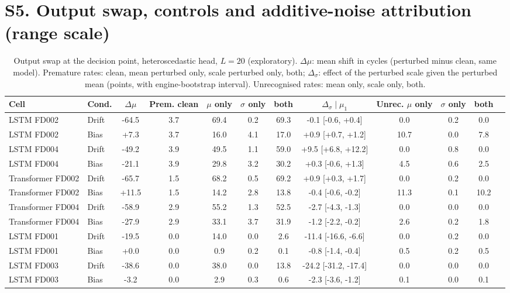 \documentclass[10pt,a4paper]{article}
\begin{document}
\FloatBarrier
\section*{S5. Output swap, controls and additive-noise attribution (range scale)}
\begin{landscape}
\begin{table}[H]\centering\scriptsize
\caption{Output swap at the decision point, heteroscedastic head, $L=20$ (exploratory). $\Delta\mu$: mean shift in cycles (perturbed minus clean, same model). Premature rates: clean, mean perturbed only, scale perturbed only, both; $\Delta_\sigma$: effect of the perturbed scale given the perturbed mean (points, with engine-bootstrap interval). Unrecognised rates: mean only, scale only, both.}
\begin{tabular}{llcccccccccc}\toprule
Cell & Cond. & $\Delta\mu$ & Prem. clean & $\mu$ only & $\sigma$ only & both & $\Delta_\sigma\mid\mu_1$ & Unrec. $\mu$ only & $\sigma$ only & both \\ \midrule
LSTM FD002 & Drift & -64.5 & 3.7 & 69.4 & 0.2 & 69.3 & -0.1 [-0.6, +0.4] & 0.0 & 0.2 & 0.0 \\
LSTM FD002 & Bias & +7.3 & 3.7 & 16.0 & 4.1 & 17.0 & +0.9 [+0.7, +1.2] & 10.7 & 0.0 & 7.8 \\
LSTM FD004 & Drift & -49.2 & 3.9 & 49.5 & 1.1 & 59.0 & +9.5 [+6.8, +12.2] & 0.0 & 0.8 & 0.0 \\
LSTM FD004 & Bias & -21.1 & 3.9 & 29.8 & 3.2 & 30.2 & +0.3 [-0.6, +1.3] & 4.5 & 0.6 & 2.5 \\
Transformer FD002 & Drift & -65.7 & 1.5 & 68.2 & 0.5 & 69.2 & +0.9 [+0.3, +1.7] & 0.0 & 0.2 & 0.0 \\
Transformer FD002 & Bias & +11.5 & 1.5 & 14.2 & 2.8 & 13.8 & -0.4 [-0.6, -0.2] & 11.3 & 0.1 & 10.2 \\
Transformer FD004 & Drift & -58.9 & 2.9 & 55.2 & 1.3 & 52.5 & -2.7 [-4.3, -1.3] & 0.0 & 0.0 & 0.0 \\
Transformer FD004 & Bias & -27.9 & 2.9 & 33.1 & 3.7 & 31.9 & -1.2 [-2.2, -0.2] & 2.6 & 0.2 & 1.8 \\
LSTM FD001 & Drift & -19.5 & 0.0 & 14.0 & 0.0 & 2.6 & -11.4 [-16.6, -6.6] & 0.0 & 0.2 & 0.0 \\
LSTM FD001 & Bias & +0.0 & 0.0 & 0.9 & 0.2 & 0.1 & -0.8 [-1.4, -0.4] & 0.5 & 0.2 & 0.5 \\
LSTM FD003 & Drift & -38.6 & 0.0 & 38.0 & 0.0 & 13.8 & -24.2 [-31.2, -17.4] & 0.0 & 0.0 & 0.0 \\
LSTM FD003 & Bias & -3.2 & 0.0 & 2.9 & 0.3 & 0.6 & -2.3 [-3.6, -1.2] & 0.1 & 0.0 & 0.1 \\

\end{tabular}
\end{table}
\end{landscape}
\end{document}
